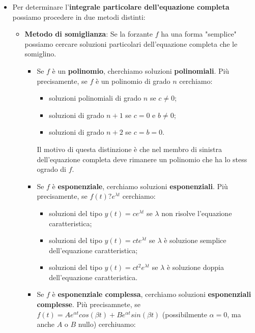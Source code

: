 \begin{itemize}
    \item Per determinare l'\textbf{integrale particolare dell'equazione completa} possiamo procedere in due metodi distinti:
    \begin{itemize}
        \item \textbf{Metodo di somiglianza}:\newline
        Se la forzante $f$ ha una forma "semplice" possiamo cercare soluzioni particolari dell'equazione completa che le somiglino.
        \begin{itemize}
            \item Se $f$ è un \textbf{polinomio}, cherchiamo soluzioni \textbf{polinomiali}.\newline
            Più precisamente, se $f$ è un polinomio di grado $n$ cerchiamo:
            \begin{itemize}
                \item soluzioni polinomiali di grado $n$ se $c \neq 0$;
                \item soluzioni di grado $n+1$ se $c=0$ e $b\neq 0$;
                \item soluzioni di grado $n+2$ se $c=b=0$.
            \end{itemize}
            Il motivo di questa distinzione è che nel membro di sinistra dell'equazione completa deve rimanere un polinomio che ha lo stess ogrado di $f$.
            \item Se $f$ è \textbf{esponenziale}, cerchiamo soluzioni \textbf{esponenziali}.\newline
            Più precisamente, se $f(t) ? e^{\lambda t}$ cerchiamo:
            \begin{itemize}
                \item soluzioni del tipo $y(t) = ce^{\lambda t}$ se $\lambda$ non risolve l'equazione caratteristica;
                \item soluzioni del tipo $y(t) = cte^{\lambda t}$ se $\lambda$ è soluzione semplice dell'equazione caratteristica;
                \item soluzioni del tipo $y(t) = ct^2e^{\lambda t}$ se $\lambda$ è soluzione doppia dell'equazione caratteristica.
            \end{itemize}
            \item Se $f$ è \textbf{esponenziale complessa}, cerchiamo soluzioni \textbf{esponenziali complesse}.\newline
            Più precisamnete, se $f(t) = Ae^{\alpha t} cos(\beta t) + Be^{\alpha t} sin(\beta t)$ (possibilmente $\alpha = 0$, ma anche $A$ o $B$ nullo) cerchiuamo:

\end{itemize}
\end{itemize}
\end{itemize}
